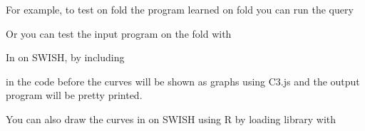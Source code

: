 \documentclass[letterpaper,10pt,english]{sphinxmanual}
\begin{document}
\sphinxAtStartPar
For example, to test on fold  the program learned on fold  you can run the query

\begin{sphinxVerbatim}[commandchars=\\\{\}]
 \PYG{p}{[}\PYG{p}{]}
\PYG{p}{[}\PYG{p}{]}
\end{sphinxVerbatim}

\sphinxAtStartPar
Or you can test the input program on the fold  with

\begin{sphinxVerbatim}[commandchars=\\\{\}]
 \PYG{p}{[}\PYG{p}{]}
\end{sphinxVerbatim}

\sphinxAtStartPar
In  on SWISH, by including

\begin{sphinxVerbatim}[commandchars=\\\{\}]
 
 
\end{sphinxVerbatim}

\sphinxAtStartPar
in the code before  the curves will be shown as graphs using C3.js and the output program will be pretty printed.

\sphinxAtStartPar
You can also draw the curves in  on SWISH using R by loading library  with

\begin{sphinxVerbatim}[commandchars=\\\{\}]
 
\end{sphinxVerbatim}
\end{document}
